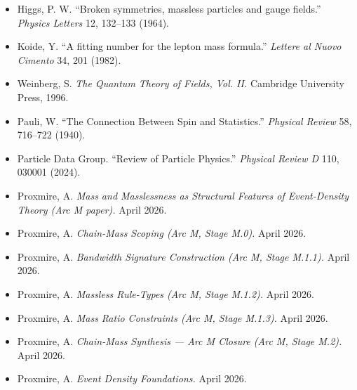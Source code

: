 \documentclass[11pt,a4paper]{article}
\begin{document}
\begin{itemize}[leftmargin=*,itemsep=2pt]
  \item Higgs, P. W. ``Broken symmetries, massless particles and gauge fields.'' \emph{Physics Letters} 12, 132--133 (1964).
  \item Koide, Y. ``A fitting number for the lepton mass formula.'' \emph{Lettere al Nuovo Cimento} 34, 201 (1982).
  \item Weinberg, S. \emph{The Quantum Theory of Fields, Vol. II.} Cambridge University Press, 1996.
  \item Pauli, W. ``The Connection Between Spin and Statistics.'' \emph{Physical Review} 58, 716--722 (1940).
  \item Particle Data Group. ``Review of Particle Physics.'' \emph{Physical Review D} 110, 030001 (2024).
  \item Proxmire, A. \emph{Mass and Masslessness as Structural Features of Event-Density Theory (Arc M paper).} April 2026.
  \item Proxmire, A. \emph{Chain-Mass Scoping (Arc M, Stage M.0).} April 2026.
  \item Proxmire, A. \emph{Bandwidth Signature Construction (Arc M, Stage M.1.1).} April 2026.
  \item Proxmire, A. \emph{Massless Rule-Types (Arc M, Stage M.1.2).} April 2026.
  \item Proxmire, A. \emph{Mass Ratio Constraints (Arc M, Stage M.1.3).} April 2026.
  \item Proxmire, A. \emph{Chain-Mass Synthesis --- Arc M Closure (Arc M, Stage M.2).} April 2026.
  \item Proxmire, A. \emph{Event Density Foundations.} April 2026.
\end{itemize}
\end{document}
